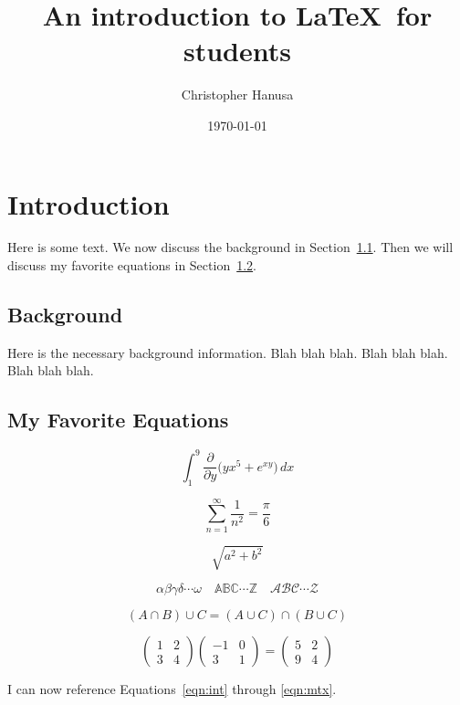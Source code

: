 \documentclass[11pt]{amsart}
\title{An introduction to \LaTeX~for students}
\author{Christopher Hanusa}
\date{\today}
\begin{document}
\maketitle
\thispagestyle{empty} %


\section{Introduction}

Here is some text.  We now discuss the background in Section~\ref{sec:background}.  Then we will discuss my favorite equations in Section~\ref{sec:eqns}.

\subsection{Background}
\label{sec:background}

Here is the necessary background information.  Blah blah blah.  Blah blah blah.  Blah blah blah.

\subsection{My Favorite Equations}
\label{sec:eqns}

\begin{equation}
\int_{1}^{9} \frac{\partial}{\partial y}\Big(yx^5+e^{xy}\Big)\, dx
\label{eqn:int}
\end{equation}

\begin{equation}
\sum_{n=1}^{\infty} \frac{1}{n^2} =\frac{\pi}{6}
\label{eqn:sum}
\end{equation}

\begin{equation}
\sqrt{a^{2} + b^{2}}
\label{eqn:sqrt}
\end{equation}

\begin{equation}
\alpha\beta\gamma\delta\cdots\omega\quad \mathbb{ABC\cdots Z}\quad \mathcal{ABC\cdots Z}
\label{eqn:labels}
\end{equation}

\begin{equation}
(A \cap B) \cup C = (A \cup C) \cap (B \cup C)
\label{eqn:cups}
\end{equation}

\begin{equation}
\begin{pmatrix} 1 & 2 \\ 3 & 4 \end{pmatrix}
\begin{pmatrix} -1 & 0 \\ 3 & 1 \end{pmatrix}=
\begin{pmatrix} 5 & 2 \\ 9 & 4 \end{pmatrix}
\label{eqn:mtx}
\end{equation}

I can now reference Equations~\eqref{eqn:int} through \eqref{eqn:mtx}.

\end{document}
